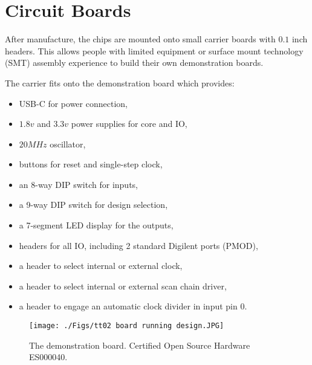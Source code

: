 \section{Circuit Boards}
\label{sec:circuit_board}
After manufacture, the chips are mounted onto small carrier boards with \(0.1\) inch headers. This allows people with limited equipment or surface mount technology (SMT) assembly experience to build their own demonstration boards.


The carrier fits onto the demonstration board which provides:
\begin{itemize}
\item USB-C for power connection,
\item \(1.8v\) and \(3.3v\) power supplies for core and IO,
\item \(20MHz\) oscillator,
\item buttons for reset and single-step clock,
\item an 8-way DIP switch for inputs,
\item a 9-way DIP switch for design selection,
\item a 7-segment LED display for the outputs,
\item headers for all IO, including 2 standard Digilent ports (PMOD),
\item a header to select internal or external clock,
\item a header to select internal or external scan chain driver,
\item a header to engage an automatic clock divider in input pin 0.
\end{itemize}

\begin{figure}[htp]
\centering
\texttt{[image: ./Figs/tt02 board running design.JPG]}
\caption{The demonstration board. Certified Open Source Hardware ES000040\cite{oshwacertification}.}
\label{fig:demonstration_board}
\end{figure}
